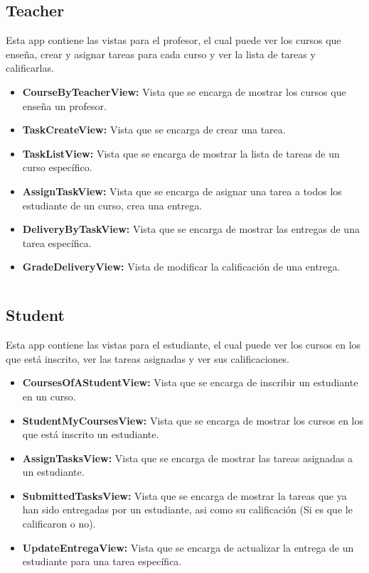 \documentclass{article}
\begin{document}
\subsection{Teacher}
Esta app contiene las vistas para el profesor, el cual puede ver los cursos que enseña, crear y asignar tareas para cada curso y ver la lista de tareas y calificarlas.
\begin{itemize}
	\item \textbf{CourseByTeacherView:} Vista que se encarga de mostrar los cursos que enseña un profesor.
	\item \textbf{TaskCreateView:} Vista que se encarga de crear una tarea.
	\item \textbf{TaskListView:} Vista que se encarga de mostrar la lista de tareas de un curso específico.
	\item \textbf{AssignTaskView:} Vista que se encarga de asignar una tarea a todos los estudiante de un curso, crea una entrega.
	\item \textbf{DeliveryByTaskView:} Vista que se encarga de mostrar las entregas de una tarea específica.
	\item \textbf{GradeDeliveryView:} Vista de modificar la calificación de una entrega.
\end{itemize}
\inputminted{python3}{../backend/teacher/views.py}
\subsection{Student}
Esta app contiene las vistas para el estudiante, el cual puede ver los cursos en los que está inscrito, ver las tareas asignadas y ver sus calificaciones.
\begin{itemize}
	\item \textbf{CoursesOfAStudentView:} Vista que se encarga de inscribir un estudiante en un curso.
	\item \textbf{StudentMyCoursesView:} Vista que se encarga de mostrar los cursos en los que está inscrito un estudiante.
	\item \textbf{AssignTasksView:} Vista que se encarga de mostrar las tareas asignadas a un estudiante.
	\item \textbf{SubmittedTasksView:} Vista que se encarga de mostrar la tareas que ya han sido entregadas por un estudiante, asi como su calificación (Si es que le calificaron o no).
	\item \textbf{UpdateEntregaView:} Vista que se encarga de actualizar la entrega de un estudiante para una tarea específica.
\end{itemize}
\inputminted{python3}{../backend/student/views.py}
\end{document}
